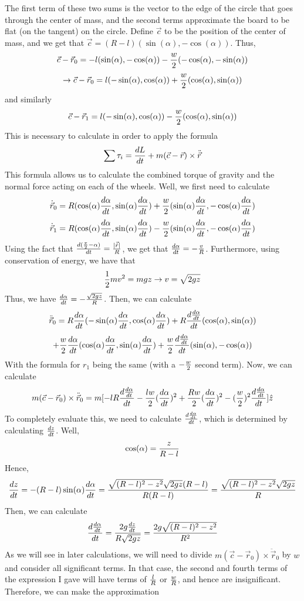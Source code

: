 The first term of these two sums is the vector to the edge of the circle that goes through the center of mass, and the second terms approximate the board to be flat (on the tangent) on the circle.  Define $\vec c$ to be the position of the center of mass, and we get that $\vec c=(R-l)(\sin(\alpha), -\cos(\alpha))$.  Thus,
$$\vec c-\vec r_0=-l(\sin(\alpha), -\cos(\alpha))-\frac{w}{2}(-\cos(\alpha), -\sin(\alpha))$$
$$\rightarrow \vec c-\vec r_0=l(-\sin(\alpha), \cos(\alpha))+\frac w 2(\cos(\alpha), \sin(\alpha))$$
and similarly
$$\vec c-\vec r_1=l(-\sin(\alpha), \cos(\alpha))-\frac w 2(\cos(\alpha), \sin(\alpha))$$
This is necessary to calculate in order to apply the formula
$$\sum \tau_i=\frac{dL}{dt}+m(\vec c-\vec r)\times \ddot {\vec r}$$
This formula allows us to calculate the combined torque of gravity and the normal force acting on each of the wheels.  Well, we first need to calculate
$$\dot{\vec r}_0=R(\cos(\alpha)\frac{d\alpha}{dt}, \sin(\alpha)\frac{d\alpha}{dt})+\frac w 2(\sin(\alpha)\frac{d\alpha}{dt}, -\cos(\alpha)\frac{d\alpha}{dt})$$
$$\dot{\vec r}_1=R(\cos(\alpha)\frac{d\alpha}{dt}, \sin(\alpha)\frac{d\alpha}{dt})-\frac w 2 (\sin(\alpha)\frac{d\alpha}{dt}, -\cos(\alpha)\frac{d\alpha}{dt})$$
Using the fact that $\frac{d(\frac \pi 2-\alpha)}{dt}=\frac{|\vec {\dot r}|}{R}$, we get that $\frac{d\alpha}{dt}=-\frac {v} R$.  Furthermore, using conservation of energy, we have that
$$\frac 1 2 m v^2=mgz\rightarrow v=\sqrt {2gz}$$
Thus, we have $\frac{d\alpha}{dt}=-\frac{\sqrt {2gz}}R$.  Then, we can calculate
$$\ddot{\vec r}_0=R\frac{d\alpha}{dt}(-\sin(\alpha)\frac{d\alpha}{dt}, \cos(\alpha) \frac{d\alpha}{dt})+R \frac{d\frac{d\alpha}{dt}}{dt}(\cos(\alpha), \sin(\alpha))$$
$$+\frac w 2 \frac{d\alpha}{dt} (\cos(\alpha) \frac{d\alpha}{dt}, \sin(\alpha) \frac{d\alpha}{dt})+\frac w 2 \frac{d\frac{d\alpha}{dt}}{dt}(\sin(\alpha), -\cos(\alpha))$$
With the formula for $r_1$ being the same (with a $-\frac w 2$ second term).  Now, we can calculate
$$m(\vec c-\vec r_0)\times \ddot {\vec r}_0=m[-l R \frac{d\frac{d\alpha}{dt}}{dt}-\frac{lw}{2}(\frac{d\alpha}{dt})^2+\frac {Rw}{2}(\frac{d\alpha}{dt})^2-(\frac w 2)^2 \frac{d\frac{d\alpha}{dt}}{dt}]\hat z$$
To completely evaluate this, we need to calculate $\frac{d\frac{d\alpha}{dt}}{dt}$, which is determined by calculating $\frac{dz}{dt}$.  Well, 
$$\cos(\alpha)=\frac{z}{R-l}$$
Hence, $$\frac{dz}{dt}=-(R-l)\sin(\alpha) \frac{d\alpha}{dt}=\frac{\sqrt{(R-l)^2-z^2}\sqrt{2gz}(R-l)}{R(R-l)}=\frac{\sqrt{(R-l)^2-z^2}\sqrt{2gz}}{R}$$
Then, we can calculate
$$\frac{d\frac{d\alpha}{dt}}{dt}=\frac {2g \frac{dz}{dt}}{R\sqrt{2gz}}=\frac {2g \sqrt{(R-l)^2-z^2}}{R^2}$$
As we will see in later calculations, we will need to divide $m(\vec c-\vec r_0)\times \ddot {\vec r}_0$ by $w$ and consider all significant terms.  In that case, the second and fourth terms of the expression I gave will have terms of $\frac{l}{R}$ or $\frac{w}{R}$, and hence are insignificant.  Therefore, we can make the approximation
